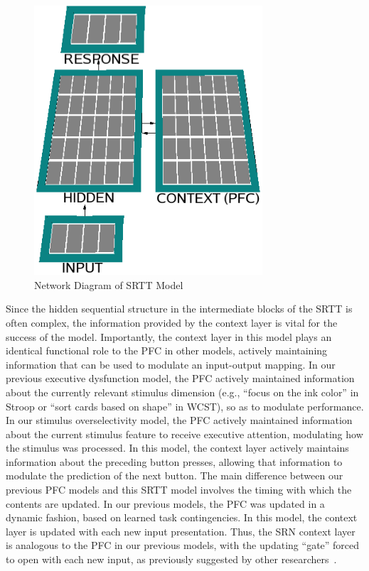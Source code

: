 \begin{figure}[t]
\begin{center}
	\includegraphics[width=85mm]{figures/srtt_network.eps}
\end{center}
\caption{Network Diagram of SRTT Model} 
\label{network-diagram-srtt}
\end{figure}

Since the hidden sequential structure in the intermediate blocks of the SRTT is often complex, the information provided by the context layer is vital for the success of the model.  Importantly, the context layer in this model plays an identical functional role to the PFC in other models, actively maintaining information that can be used to modulate an input-output mapping.  In our previous executive dysfunction model, the PFC actively maintained information about the currently relevant stimulus dimension (e.g., ``focus on the ink color'' in Stroop or ``sort cards based on shape'' in WCST), so as to modulate performance.  In our stimulus overselectivity model, the PFC actively maintained information about the current stimulus feature to receive executive attention, modulating how the stimulus was processed.  In this model, the context layer actively maintains information about the preceding button presses, allowing that information to modulate the prediction of the next button.  The main difference between our previous PFC models and this SRTT model involves the timing with which the contents are updated.  In our previous models, the PFC was updated in a dynamic fashion, based on learned task contingencies.  In this model, the context layer is updated with each new input presentation.  Thus, the SRN context layer is analogous to the PFC in our previous models, with the updating ``gate'' forced to open with each new input, as previously suggested by other researchers~\cite{OReillyRC:2006:MWMW}.

